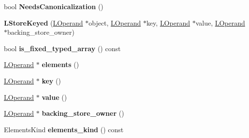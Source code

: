 \begin{DoxyCompactItemize}
\item 
bool {\bfseries Needs\+Canonicalization} ()\hypertarget{classv8_1_1internal_1_1_l_store_keyed_a638212d8d0abef68447e1451b452ac14}{}\label{classv8_1_1internal_1_1_l_store_keyed_a638212d8d0abef68447e1451b452ac14}

\item 
{\bfseries L\+Store\+Keyed} (\hyperlink{classv8_1_1internal_1_1_l_operand}{L\+Operand} $\ast$object, \hyperlink{classv8_1_1internal_1_1_l_operand}{L\+Operand} $\ast$key, \hyperlink{classv8_1_1internal_1_1_l_operand}{L\+Operand} $\ast$value, \hyperlink{classv8_1_1internal_1_1_l_operand}{L\+Operand} $\ast$backing\+\_\+store\+\_\+owner)\hypertarget{classv8_1_1internal_1_1_l_store_keyed_a40acd77f50898d8601b8587509f6443f}{}\label{classv8_1_1internal_1_1_l_store_keyed_a40acd77f50898d8601b8587509f6443f}

\item 
bool {\bfseries is\+\_\+fixed\+\_\+typed\+\_\+array} () const \hypertarget{classv8_1_1internal_1_1_l_store_keyed_a9e741b26eae820e0effc84187cef9fd1}{}\label{classv8_1_1internal_1_1_l_store_keyed_a9e741b26eae820e0effc84187cef9fd1}

\item 
\hyperlink{classv8_1_1internal_1_1_l_operand}{L\+Operand} $\ast$ {\bfseries elements} ()\hypertarget{classv8_1_1internal_1_1_l_store_keyed_a65b49dc68849be2f341b9f6db3399248}{}\label{classv8_1_1internal_1_1_l_store_keyed_a65b49dc68849be2f341b9f6db3399248}

\item 
\hyperlink{classv8_1_1internal_1_1_l_operand}{L\+Operand} $\ast$ {\bfseries key} ()\hypertarget{classv8_1_1internal_1_1_l_store_keyed_a768f44140c1abab8ec345ef73cb417ea}{}\label{classv8_1_1internal_1_1_l_store_keyed_a768f44140c1abab8ec345ef73cb417ea}

\item 
\hyperlink{classv8_1_1internal_1_1_l_operand}{L\+Operand} $\ast$ {\bfseries value} ()\hypertarget{classv8_1_1internal_1_1_l_store_keyed_a6a97e536a0eed02971eb915a57b6e898}{}\label{classv8_1_1internal_1_1_l_store_keyed_a6a97e536a0eed02971eb915a57b6e898}

\item 
\hyperlink{classv8_1_1internal_1_1_l_operand}{L\+Operand} $\ast$ {\bfseries backing\+\_\+store\+\_\+owner} ()\hypertarget{classv8_1_1internal_1_1_l_store_keyed_a21d192f5ddd6bbb5198880a6e2d03db3}{}\label{classv8_1_1internal_1_1_l_store_keyed_a21d192f5ddd6bbb5198880a6e2d03db3}

\item 
Elements\+Kind {\bfseries elements\+\_\+kind} () const \hypertarget{classv8_1_1internal_1_1_l_store_keyed_a09fd8ff5055daa16ec86a8f9bf4a1388}{}\label{classv8_1_1internal_1_1_l_store_keyed_a09fd8ff5055daa16ec86a8f9bf4a1388}


\end{DoxyCompactItemize}
